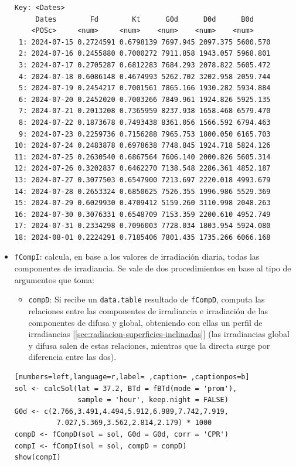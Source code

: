 \begin{itemize}
\begin{verbatim}
Key: <Dates>
	 Dates        Fd        Kt      G0d      D0d      B0d
	<POSc>     <num>     <num>    <num>    <num>    <num>
 1: 2024-07-15 0.2724591 0.6798139 7697.945 2097.375 5600.570
 2: 2024-07-16 0.2455880 0.7000272 7911.858 1943.057 5968.801
 3: 2024-07-17 0.2705287 0.6812283 7684.293 2078.822 5605.472
 4: 2024-07-18 0.6086148 0.4674993 5262.702 3202.958 2059.744
 5: 2024-07-19 0.2454217 0.7001561 7865.166 1930.282 5934.884
 6: 2024-07-20 0.2452020 0.7003266 7849.961 1924.826 5925.135
 7: 2024-07-21 0.2013208 0.7365959 8237.938 1658.468 6579.470
 8: 2024-07-22 0.1873678 0.7493438 8361.056 1566.592 6794.463
 9: 2024-07-23 0.2259736 0.7156288 7965.753 1800.050 6165.703
10: 2024-07-24 0.2483878 0.6978638 7748.845 1924.718 5824.126
11: 2024-07-25 0.2630540 0.6867564 7606.140 2000.826 5605.314
12: 2024-07-26 0.3202837 0.6462270 7138.548 2286.361 4852.187
13: 2024-07-27 0.3077503 0.6547900 7213.697 2220.018 4993.679
14: 2024-07-28 0.2653324 0.6850625 7526.355 1996.986 5529.369
15: 2024-07-29 0.6029930 0.4709412 5159.260 3110.998 2048.263
16: 2024-07-30 0.3076331 0.6548709 7153.359 2200.610 4952.749
17: 2024-07-31 0.2334298 0.7096003 7728.034 1803.954 5924.080
18: 2024-08-01 0.2224291 0.7185406 7801.435 1735.266 6066.168
\end{verbatim}

\item \texttt{fCompI}: calcula, en base a los valores de irradiación diaria, todas las componentes de irradiancia. Se vale de dos procedimientos en base al tipo de argumentos que toma:
\begin{itemize}
\item \texttt{compD}: Si recibe un \texttt{data.table} resultado de \texttt{fCompD}, computa las relaciones entre las componentes de irradiancia e irradiación de las componentes de difusa y global, obteniendo con ellas un perfil de irradiancias [\ref{sec:radiacion-superficies-inclinadas}] (las irradiancias global y difusa salen de estas relaciones, mientras que la directa surge por diferencia entre las dos).
\end{itemize}
\begin{lstlisting}[numbers=left,language=r,label= ,caption= ,captionpos=b]
sol <- calcSol(lat = 37.2, BTd = fBTd(mode = 'prom'),
               sample = 'hour', keep.night = FALSE)
G0d <- c(2.766,3.491,4.494,5.912,6.989,7.742,7.919,
          7.027,5.369,3.562,2.814,2.179) * 1000
compD <- fCompD(sol = sol, G0d = G0d, corr = 'CPR')
compI <- fCompI(sol = sol, compD = compD)
show(compI)
\end{lstlisting}


\end{itemize}
